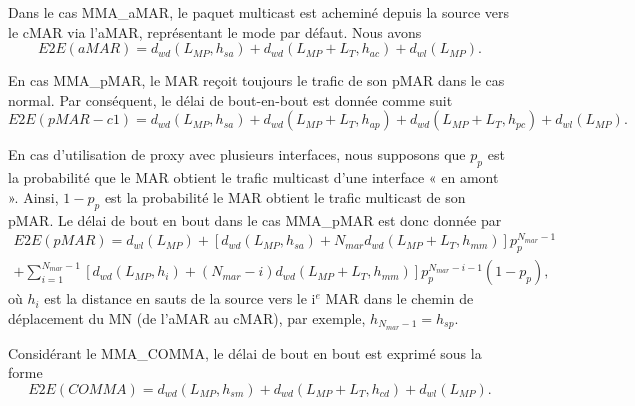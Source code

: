 Dans le cas MMA\_aMAR, le paquet multicast est acheminé depuis la source vers le cMAR via l'aMAR, représentant le mode par défaut. Nous avons \\
\begin{equation}
E2E(aMAR) = d_{wd}(L_{MP},h_{sa}) + d_{wd}(L_{MP}+L_{T},h_{ac}) + d_{wl}(L_{MP}).
\end{equation}

En cas MMA\_pMAR, le MAR reçoit toujours le trafic de son pMAR dans le cas normal. Par conséquent, le délai de bout-en-bout est donnée comme suit \\
\begin{equation}
E2E(pMAR-c1)= d_{wd}(L_{MP},h_{sa}) + d_{wd}(L_{MP} +L_{T},h_{ap}) + d_{wd}(L_{MP} + L_{T},h_{pc})  + d_{wl}(L_{MP}).
\end{equation}

En cas d'utilisation de proxy avec plusieurs interfaces, nous supposons que $ p_{p} $ est la probabilité que le MAR obtient le trafic multicast d'une interface « en amont ». Ainsi, $ 1-p_{p} $ est la probabilité le MAR obtient le trafic multicast de son pMAR. Le délai de bout en bout dans le cas MMA\_pMAR est donc donnée par
\begin{multline}
E2E(pMAR)=   d_{wl}(L_{MP}) + [d_{wd}(L_{MP},h_{sa})+ N_{mar} d_{wd}(L_{MP} +L_{T},h_{mm})] p_{p}^{N_{mar}-1} \\+ \sum_{i=1}^{N_{mar}-1} [d_{wd}(L_{MP},h_{i})+ (N_{mar}-i) d_{wd}(L_{MP} +L_{T},h_{mm})] p_{p}^{N_{mar}-i-1} (1-p_{p}),
\end{multline}
où $ h_{i} $ est la distance en sauts de la source vers le i$^{e} $ MAR dans le chemin de déplacement du MN (de l'aMAR au cMAR), par exemple, $ h_{N_{mar}-1} = h_{sp}$.  

Considérant le MMA\_COMMA, le délai de bout en bout est exprimé sous la forme \\
\begin{equation}
E2E(COMMA) = d_{wd}(L_{MP},h_{sm})  + d_{wd}(L_{MP}+L_{T},h_{cd}) + d_{wl}(L_{MP}).
\end{equation}

